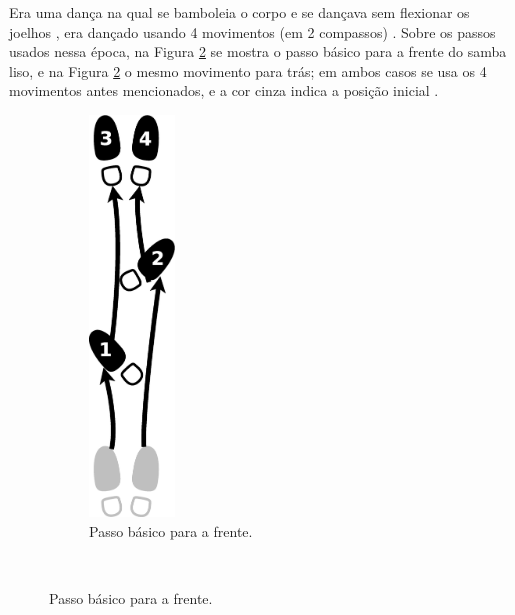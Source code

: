 
Era uma dança na qual se bamboleia o corpo e se dançava sem flexionar os joelhos \cite[pp. 58]{freitas1959danca} \cite[pp. 143]{perna2002samba},
era dançado usando 4 movimentos (em 2 compassos) \cite[pp. 62]{freitas1959danca} \cite[pp. 143]{perna2002samba}.
Sobre os passos usados nessa época, 
na Figura \ref{fig:samba-liso-basico-frente} se mostra o passo básico para a frente do samba liso,
e na  Figura \ref{fig:samba-liso-basico-frente} o mesmo movimento para trás; 
em ambos casos se usa os 4 movimentos antes mencionados, e a cor cinza indica a posição inicial \cite[pp. 63]{freitas1959danca}. 
\begin{figure}[h]
    \centering
    \begin{subfigure}[b]{0.4\textwidth}
        \centering
        \includegraphics[width=0.25\textwidth]{chapters/cap-historia-dancasamba/samba-liso-basico-frente.eps}
        \caption{Passo básico para a frente.}
        \label{fig:samba-liso-basico-frente}
    \end{subfigure}
    ~ %

\end{figure}

